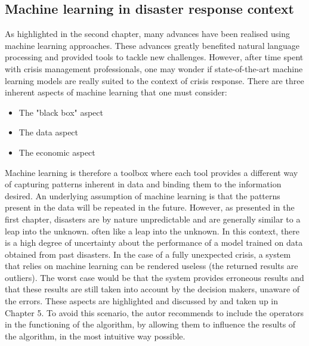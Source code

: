 \subsection{Machine learning in disaster response context}
As highlighted in the second chapter, many advances have been realised using machine learning approaches.
These advances greatly benefited natural language processing and provided tools to tackle
new challenges.
However, after time spent with crisis management professionals, one may wonder if
state-of-the-art machine learning models are really suited to the context of crisis response.
There are three inherent aspects of machine learning that one must consider:

\begin{itemize}
    \item The "black box" aspect
    \item The data aspect
    \item The economic aspect
\end{itemize}

Machine learning is therefore a toolbox where each tool provides a different way of capturing
patterns inherent in data and binding them to the information desired.
An underlying assumption of machine learning is that the patterns present in the data will
be repeated in the future.
However, as presented in the first chapter, disasters are by nature unpredictable and are
generally similar to a leap into the unknown.
often like a leap into the unknown.
In this context, there is a high degree of uncertainty about the performance of a model
trained on data obtained from past disasters.
In the case of a fully unexpected crisis, a system that relies on machine learning can
be rendered useless (the returned results are outliers).
The worst case would be that the system provides erroneous results and that these results
are still taken into account by the decision makers, unaware of the errors.
These aspects are highlighted and discussed by \textcite{endsleyDesigningSituationAwareness2016} and taken up in Chapter 5.
To avoid this scenario, the autor recommends to include the operators in the functioning
of the algorithm, by allowing them to influence the results of the algorithm, in the most intuitive way possible.

